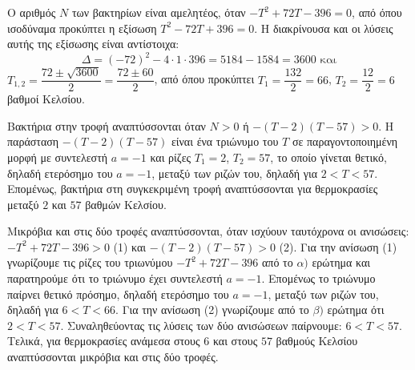 
\begin{alist}
\item Ο αριθμός $N$ των βακτηρίων είναι αμελητέος, όταν $-T^2 + 72T - 396 = 0$, από όπου ισοδύναμα προκύπτει η εξίσωση $T^2 - 72T + 396 = 0$. Η διακρίνουσα και οι λύσεις αυτής της εξίσωσης είναι αντίστοιχα:
\[\Delta = (-72)^2 - 4 \cdot 1 \cdot 396 = 5184 - 1584 = 3600\text{ και}\]
$T_{1,2} = \dfrac{72 \pm \sqrt{3600}}{2} = \dfrac{72 \pm 60}{2}$, από όπου προκύπτει $T_1 = \dfrac{132}{2} = 66$, $T_2 = \dfrac{12}{2} = 6$
βαθμοί Κελσίου.

\item Βακτήρια στην τροφή αναπτύσσονται όταν $N > 0$ ή $-(T - 2)(T - 57) > 0$. Η παράσταση $-(T - 2)(T - 57)$ είναι ένα τριώνυμο του $T$ σε παραγοντοποιημένη μορφή με συντελεστή $a = -1$ και ρίζες $T_1 = 2$, $T_2 = 57$, το οποίο γίνεται θετικό, δηλαδή ετερόσημο του $a = -1$, μεταξύ των ριζών του, δηλαδή για $2 < T < 57$. Επομένως, βακτήρια στη συγκεκριμένη τροφή αναπτύσσονται για θερμοκρασίες μεταξύ $2$ και $57$ βαθμών Κελσίου.

\item Μικρόβια και στις δύο τροφές αναπτύσσονται, όταν ισχύουν ταυτόχρονα οι ανισώσεις:
$-T^2 + 72T - 396 > 0$ (1) και $-(T - 2)(T - 57) > 0$ (2).
Για την ανίσωση (1) γνωρίζουμε τις ρίζες του τριωνύμου $-T^2 + 72T - 396$ από το $\alpha)$ ερώτημα και παρατηρούμε ότι το τριώνυμο έχει συντελεστή $a = -1$. Επομένως το τριώνυμο παίρνει θετικό πρόσημο, δηλαδή ετερόσημο του $a = -1$, μεταξύ των ριζών του, δηλαδή για $6 < T < 66$.
Για την ανίσωση (2) γνωρίζουμε από το $\beta)$ ερώτημα ότι $2 < T < 57$.
Συναληθεύοντας τις λύσεις των δύο ανισώσεων παίρνουμε: $6 < T < 57$. Τελικά, για θερμοκρασίες ανάμεσα στους $6$ και στους $57$ βαθμούς Κελσίου αναπτύσσονται μικρόβια και στις δύο τροφές.
\end{alist}

